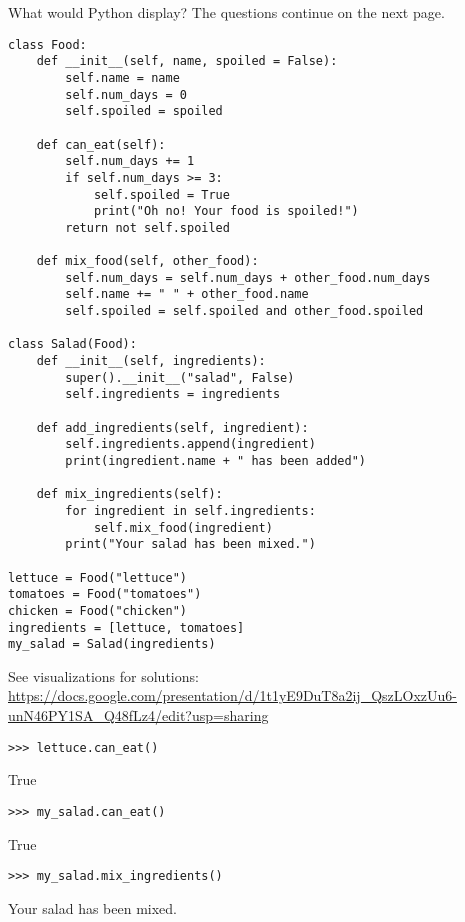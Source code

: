 \question 
What would Python display? The questions continue on the next page.

\begin{lstlisting}
class Food:
    def __init__(self, name, spoiled = False):
        self.name = name
        self.num_days = 0
        self.spoiled = spoiled

    def can_eat(self):
        self.num_days += 1
        if self.num_days >= 3:
            self.spoiled = True
            print("Oh no! Your food is spoiled!")
        return not self.spoiled

    def mix_food(self, other_food):
        self.num_days = self.num_days + other_food.num_days
        self.name += " " + other_food.name
        self.spoiled = self.spoiled and other_food.spoiled

class Salad(Food):
    def __init__(self, ingredients):
        super().__init__("salad", False)
        self.ingredients = ingredients
		
    def add_ingredients(self, ingredient):
        self.ingredients.append(ingredient)
        print(ingredient.name + " has been added")

    def mix_ingredients(self):
        for ingredient in self.ingredients:
            self.mix_food(ingredient)
        print("Your salad has been mixed.")

lettuce = Food("lettuce")
tomatoes = Food("tomatoes")
chicken = Food("chicken")
ingredients = [lettuce, tomatoes]
my_salad = Salad(ingredients)
\end{lstlisting}

\vspace{9\baselineskip}
\begin{solution}
See visualizations for solutions: \url{https://docs.google.com/presentation/d/1t1yE9DuT8a2ij_QszLOxzUu6-unN46PY1SA_Q48fLz4/edit?usp=sharing}
\end{solution}

\begin{lstlisting}
>>> lettuce.can_eat()
\end{lstlisting}
\begin{solution}[.2in]
True
\end{solution}

\begin{lstlisting}
>>> my_salad.can_eat()
\end{lstlisting}
\begin{solution}[.2in]
True
\end{solution}

\begin{lstlisting}
>>> my_salad.mix_ingredients()
\end{lstlisting}
\begin{solution}[.2in]
Your salad has been mixed.
\end{solution}

